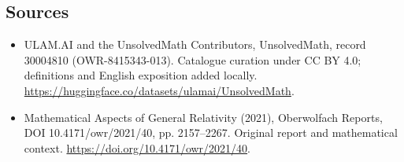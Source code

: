 \documentclass[11pt]{article}
\begin{document}
\subsection{Sources}
\begin{itemize}
\item[\hypertarget{source:30004810:1}{S1}] ULAM.AI and the UnsolvedMath Contributors, UnsolvedMath, record 30004810 (OWR-8415343-013). Catalogue curation under CC BY 4.0; definitions and English exposition added locally.
\url{https://huggingface.co/datasets/ulamai/UnsolvedMath}.
\item[\hypertarget{source:30004810:2}{S2}] Mathematical Aspects of General Relativity (2021), Oberwolfach Reports, DOI 10.4171/owr/2021/40, pp. 2157--2267. Original report and mathematical context.
\url{https://doi.org/10.4171/owr/2021/40}.
\end{itemize}
\label{end:30004810}
\end{document}
